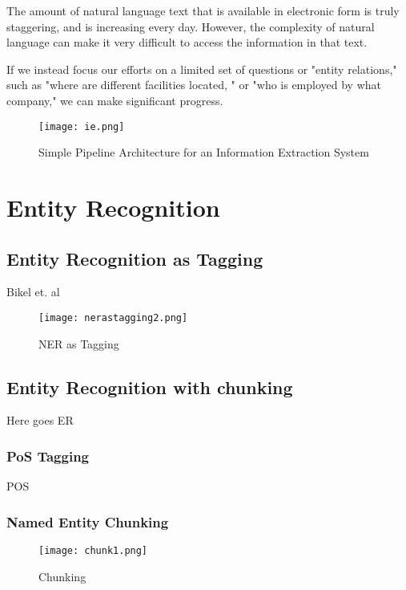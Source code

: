 \documentclass[12pt]{report}
\begin{document}
The amount of natural language text that is available in electronic 
form is truly staggering, and is increasing every day. 
However, 
the complexity of natural language can make it very difficult to access the information in that text\cite{BookIE}.\\

\par If we instead focus our efforts on a limited set of questions or 
"entity relations," such as "where are different facilities located,
" or "who is employed by what company," we can make significant progress.\cite{BookIE}


\begin{figure}[htp]
\centering
\texttt{[image: ie.png]}
\caption{Simple Pipeline Architecture for an Information Extraction System\cite{BookIE}}
\label{IE}
\end{figure}

\chapter{Entity Recognition}
\section{Entity Recognition as Tagging}
\par Bikel et. al
\begin{figure}[htp]
\centering
\texttt{[image: nerastagging2.png]}
\caption{NER as Tagging}
\label{NERasT}
\end{figure}

\section{Entity Recognition with chunking}
\par Here goes ER
\subsection{PoS Tagging}
POS
\subsection{Named Entity Chunking}
\begin{figure}[]
\centering
\texttt{[image: chunk1.png]}
\caption{Chunking}
\label{Chunk}
\end{figure}
\end{document}
